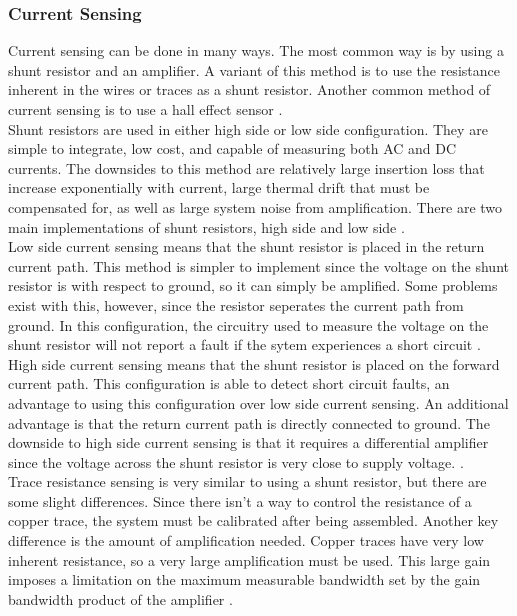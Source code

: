 \subsubsection{Current Sensing}
Current sensing can be done in many ways. The most common way is by using a shunt resistor and an amplifier. A variant of this method is to use the resistance inherent in the wires or traces as a shunt resistor. Another common method of current sensing is to use a hall effect sensor \cite{Current_Sensing}. \\
\newline
Shunt resistors are used in either high side or low side configuration. They are simple to integrate, low cost, and capable of measuring both AC and DC currents. The downsides to this method are relatively large insertion loss that increase exponentially with current, large thermal drift that must be compensated for, as well as large system noise from amplification. There are two main implementations of shunt resistors, high side and low side \cite{Current_Sensing}. \\
\newline
Low side current sensing means that the shunt resistor is placed in the return current path. This method is simpler to implement since the voltage on the shunt resistor is with respect to ground, so it can simply be amplified. Some problems exist with this, however, since the resistor seperates the current path from ground. In this configuration, the circuitry used to measure the voltage on the shunt resistor will not report a fault if the sytem experiences a short circuit \cite{Current_Sensing}. \\
\newline 
High side current sensing means that the shunt resistor is placed on the forward current path. This configuration is able to detect short circuit faults, an advantage to using this configuration over low side current sensing. An additional advantage is that the return current path is directly connected to ground. The downside to high side current sensing is that it requires a differential amplifier since the voltage across the shunt resistor is very close to supply voltage. \cite{Current_Sensing}. \\
\newline
Trace resistance sensing is very similar to using a shunt resistor, but there are some slight differences. Since there isn't a way to control the resistance of a copper trace, the system must be calibrated after being assembled. Another key difference is the amount of amplification needed. Copper traces have very low inherent resistance, so a very large amplification must be used. This large gain imposes a limitation on the maximum measurable bandwidth set by the gain bandwidth product of the amplifier \cite{Current_Sensing}. \\
